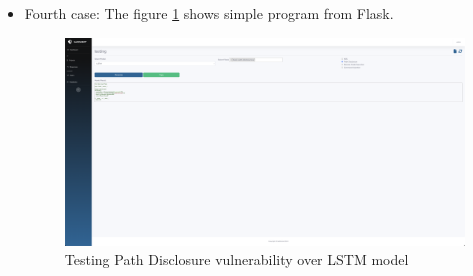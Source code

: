 \begin{itemize}
    \item Fourth case: The figure \ref{img:pd1} shows simple program from Flask.
    \begin{figure}[H]
        \centering
        \includegraphics[width=0.6\linewidth]{images/pd1.png}
        \caption{Testing Path Disclosure vulnerability over LSTM model}
        \label{img:pd1}
    \end{figure}

\end{itemize}